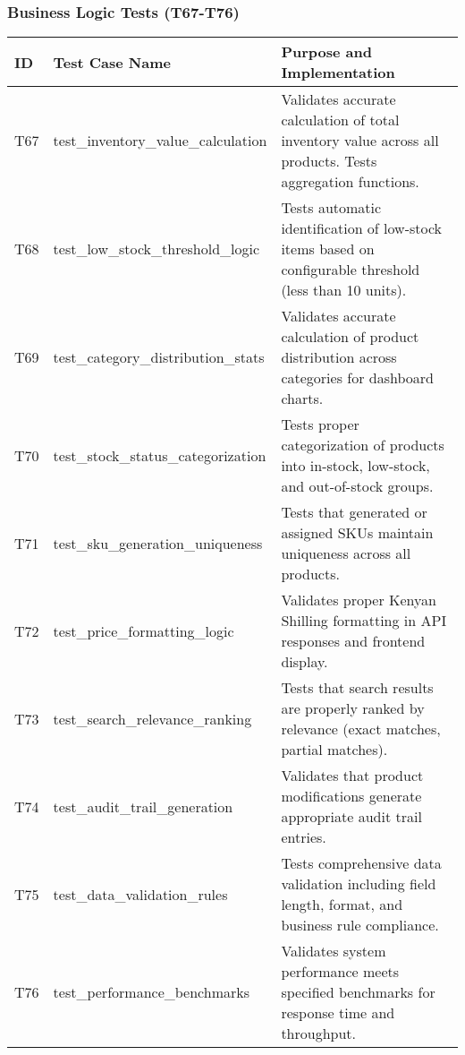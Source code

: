 \documentclass[12pt,a4paper]{article}
\begin{document}
\subsubsection{Business Logic Tests (T67-T76)}

\begin{longtable}{|p{1cm}|p{5cm}|p{8.5cm}|}
\hline
\rowcolor{purple!20}
\textbf{ID} & \textbf{Test Case Name} & \textbf{Purpose and Implementation} \\
\hline
\endhead

T67 & test\_inventory\_value\_calculation & Validates accurate calculation of total inventory value across all products. Tests aggregation functions. \\
\hline

T68 & test\_low\_stock\_threshold\_logic & Tests automatic identification of low-stock items based on configurable threshold (less than 10 units). \\
\hline

T69 & test\_category\_distribution\_stats & Validates accurate calculation of product distribution across categories for dashboard charts. \\
\hline

T70 & test\_stock\_status\_categorization & Tests proper categorization of products into in-stock, low-stock, and out-of-stock groups. \\
\hline

T71 & test\_sku\_generation\_uniqueness & Tests that generated or assigned SKUs maintain uniqueness across all products. \\
\hline

T72 & test\_price\_formatting\_logic & Validates proper Kenyan Shilling formatting in API responses and frontend display. \\
\hline

T73 & test\_search\_relevance\_ranking & Tests that search results are properly ranked by relevance (exact matches, partial matches). \\
\hline

T74 & test\_audit\_trail\_generation & Validates that product modifications generate appropriate audit trail entries. \\
\hline

T75 & test\_data\_validation\_rules & Tests comprehensive data validation including field length, format, and business rule compliance. \\
\hline

T76 & test\_performance\_benchmarks & Validates system performance meets specified benchmarks for response time and throughput. \\
\hline

\end{longtable}
\end{document}
